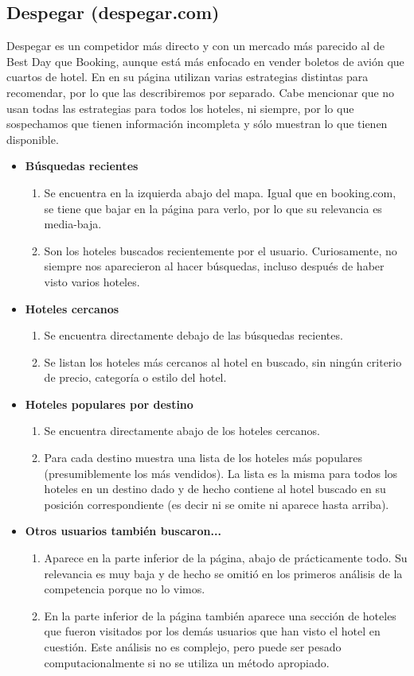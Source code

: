 \documentclass[12pt]{report}
\begin{document}
\subsection*{Despegar (despegar.com)}

Despegar es un competidor más directo y con un mercado más parecido al de Best Day que Booking, aunque está más enfocado en vender boletos de avión que cuartos de hotel. En en su página utilizan varias estrategias distintas para recomendar, por lo que las describiremos por separado. Cabe mencionar que no usan todas las estrategias para todos los hoteles, ni siempre, por lo que sospechamos que tienen información incompleta y sólo muestran lo que tienen disponible.
\begin{itemize}
	\item \textbf{Búsquedas recientes}
	\begin{enumerate}
		\item Se encuentra en la izquierda abajo del mapa. Igual que en booking.com, se tiene que bajar en la página para verlo, por lo que su relevancia es media-baja.
		\item Son los hoteles buscados recientemente por el usuario. Curiosamente, no siempre nos aparecieron al hacer búsquedas, incluso después de haber visto varios hoteles.
	\end{enumerate}
	\item \textbf{Hoteles cercanos}
	\begin{enumerate}
		\item Se encuentra directamente debajo de las búsquedas recientes.
		\item Se listan los hoteles más cercanos al hotel en buscado, sin ningún criterio de precio, categoría o estilo del hotel.
	\end{enumerate}
		\item \textbf{Hoteles populares por destino}
	\begin{enumerate}
		\item Se encuentra directamente abajo de los hoteles cercanos.
		\item Para cada destino muestra una lista de los hoteles más populares (presumiblemente los más vendidos). La lista es la misma para todos los hoteles en un destino dado y de hecho contiene al hotel buscado en su posición correspondiente (es decir ni se omite ni aparece hasta arriba).
	\end{enumerate}
	\item \textbf{Otros usuarios también buscaron...}
	\begin{enumerate}
		\item Aparece en la parte inferior de la página, abajo de prácticamente todo. Su relevancia es muy baja y de hecho se omitió en los primeros análisis de la competencia porque no lo vimos.
		\item En la parte inferior de la página también aparece una sección de hoteles que fueron visitados por los demás usuarios que han visto el hotel en cuestión. Este análisis no es complejo, pero puede ser pesado computacionalmente si no se utiliza un  método apropiado.
	\end{enumerate}
\end{itemize}
\end{document}

